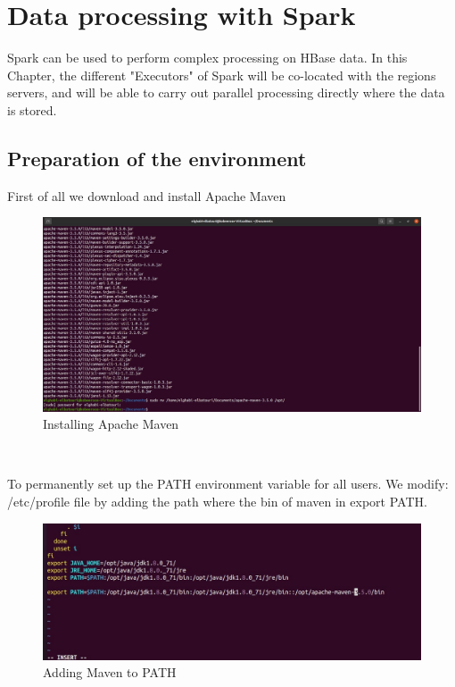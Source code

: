 \chapter{Data processing with Spark}
\par Spark can be used to perform complex processing on HBase data. In this Chapter, the different "Executors" of Spark will be co-located with the regions
servers, and will be able to carry out parallel processing directly where the data is stored.
\begin{spacing}{1.2}
\section{Preparation of the environment }
\par First of all we download and install Apache Maven
\\
\begin{figure}[!htb] 
\begin{center} 
\includegraphics[width=1\linewidth]{Pictures/HBase/Data processing with Spark/Preparation of the environment/Installing Apache Maven} 
\end{center} 
\caption{Installing Apache Maven} 
\end{figure}  \FloatBarrier
\\
\newpage
\par To permanently set up the PATH environment variable for all users. We modify: /etc/profile file by adding the path where the bin of maven in export PATH.
\\
\begin{figure}[!htb] 
\begin{center} 
\includegraphics[width=1\linewidth]{Pictures/HBase/Data processing with Spark/Preparation of the environment/Adding Maven to PATH} 
\end{center} 
\caption{Adding Maven to PATH} 
\end{figure}  \FloatBarrier
\\


\end{spacing}

